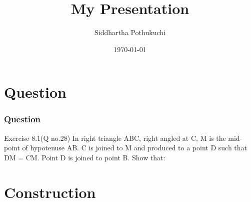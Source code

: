 \documentclass{beamer}
\title{My Presentation}
\author{Siddhartha Pothukuchi}
\institute{Indian Institute of Technology, Bhilai.}
\date{\today}
\begin{document}
\begin{frame}
\titlepage
\end{frame}
\section{Question}
\begin{frame}
\frametitle{Question}
\begin{block}{Exercise 8.1(Q no.28)}
In right triangle ABC, right angled at C, M is
the mid-point of hypotenuse AB. C is joined to
M and produced to a point D such that DM =
CM. Point D is joined to point B. Show that:
\newline
\hyperlink{a}{}
\newline
\hyperlink{b}{}
\newline
\hyperlink{c}{}
\newline
\hyperlink{d}{}

\end{block}
\end{frame}

\section{\textbf{Construction}}
\end{document}
